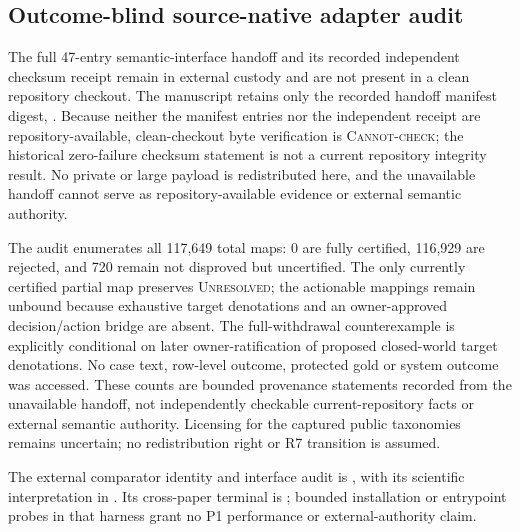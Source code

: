 \subsection{Outcome-blind source-native adapter audit}
The full 47-entry semantic-interface handoff and its recorded independent
checksum receipt remain in external custody and are not present in a clean
repository checkout. The manuscript retains only the recorded handoff manifest
digest,
.
Because neither the manifest entries nor the independent receipt are
repository-available, clean-checkout byte verification is
\textsc{Cannot-check}; the historical zero-failure checksum statement is not a
current repository integrity result. No private or large payload is
redistributed here, and the unavailable handoff cannot serve as
repository-available evidence or external semantic authority.

The audit enumerates all 117,649 total maps: 0 are fully certified, 116,929 are
rejected, and 720 remain not disproved but uncertified. The only currently
certified partial map preserves \textsc{Unresolved}; the actionable mappings
remain unbound because exhaustive target denotations and an owner-approved
decision/action bridge are absent. The full-withdrawal counterexample is
explicitly conditional on later owner-ratification of proposed closed-world
target denotations. No case text, row-level outcome, protected gold or system
outcome was accessed. These counts are bounded provenance statements recorded
from the unavailable handoff, not independently checkable current-repository
facts or external semantic authority. Licensing for the captured public
taxonomies remains uncertain; no redistribution right or R7 transition is
assumed.

The external comparator identity and interface audit is
,
with its scientific interpretation in
.
Its cross-paper terminal is ; bounded
installation or entrypoint probes in that harness grant no P1 performance or
external-authority claim.


